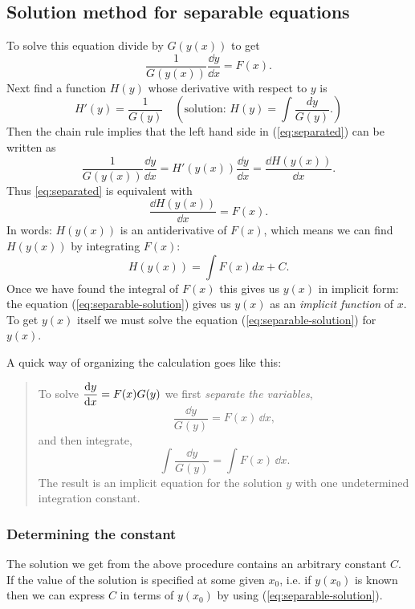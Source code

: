 \subsection{Solution method for separable equations} %
To solve this equation divide by $G(y(x))$ to get
\begin{equation}
  \label{eq:separated}
  \frac{1}{ G(y(x))} \frac{\dd y}{\dd x} = F(x). 
\end{equation}
Next find a function $H(y)$ whose derivative with respect to $y$ is
\begin{equation}\label{eq:separable-3}
  H'(y) = \frac{1}{G(y)}
  \quad\left(\text{solution: } H(y) = \int {\frac{dy}{G(y)}}.\right)
\end{equation}
Then the chain rule implies that the left hand side in (\ref{eq:separated}) can be written as
\[
  \frac{1}{ G(y(x))} \frac{\dd y}{\dd x} = H'(y(x)) \frac{\dd y}{\dd x} =
  \frac{\dd H(y(x))}{\dd x}.
\]
Thus \eqref{eq:separated} is equivalent with
\[
\frac{\dd H(y(x))}{\dd x} = F(x).
\]
In words: $H(y(x))$ is an antiderivative of $F(x)$, which means we can find $H(y(x))$
by integrating $F(x)$:
\begin{equation}
  \label{eq:separable-solution}
  H(y(x)) = \int F(x) dx +C. 
\end{equation}
Once we have found the integral of $F(x)$ this gives us $y(x)$ in implicit form: the
equation (\ref{eq:separable-solution}) gives us $y(x)$ as an \textit{implicit
  function} of $x$.  To get $y(x)$ itself we must solve the equation
(\ref{eq:separable-solution}) for $y(x)$.

A quick way of organizing the calculation goes like this:
\begin{quote}
  To solve \(\displaystyle\frac{\mathrm{d} y}{\mathrm{d} x} = F(x)G(y)\) we first \textit{separate the
    variables},
  \[
  \frac{\dd y}{G(y)} = F(x)\,\dd x,
  \]
  and then integrate,
  \[
  \int\frac{\dd y}{G(y)} = \int F(x)\,\dd x.
  \]
  The result is an implicit equation for the solution $y$ with one undetermined
  integration constant.
\end{quote}

\subsubsection*{Determining the constant} The solution we get from the above
procedure contains an arbitrary constant $C$. If the value of the solution is
specified at some given $x_0$, i.e. if $y(x_0)$ is known then we can express $C$ in
terms of $y(x_0)$ by using (\ref{eq:separable-solution}).

